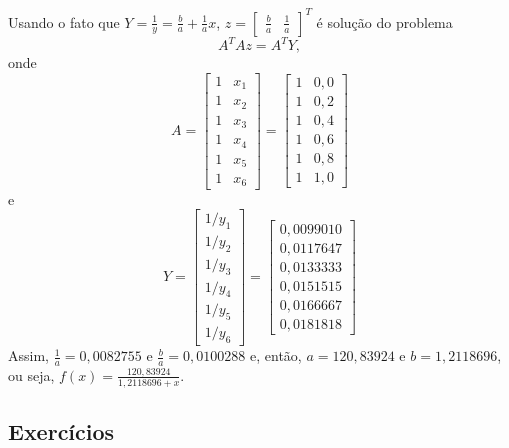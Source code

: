 \begin{resol}
Usando o fato que $Y=\frac{1}{y}=\frac{b}{a}+\frac{1}{a}x$, $z=[\begin{array}{cc}\frac{b}{a} &\frac{1}{a}\end{array}]^T$ é solução do problema
\begin{equation}
A^TAz=A^TY,
\end{equation}
onde
\begin{equation}
A=\left[\begin{array}{cc}1& x_1\\ 1& x_2\\ 1&x_3\\1&x_4 \\ 1&x_5 \\ 1&x_6 \end{array}\right]=\left[\begin{array}{cc}
  1 &  0,0\\
  1 &  0,2\\
  1 &  0,4\\
  1 &  0,6\\
  1 &  0,8\\
  1 &  1,0
\end{array}\right]
\end{equation}
e
\begin{equation}
Y=\left[\begin{array}{c}
  1/y_1\\
    1/y_2\\
    1/y_3\\
    1/y_4\\
    1/y_5\\
    1/y_6
\end{array}\right]=\left[\begin{array}{c}
  0,0099010\\
  0,0117647\\
  0,0133333\\
  0,0151515\\
  0,0166667\\
  0,0181818
\end{array}\right]
\end{equation}
Assim, $\frac{1}{a}=0,0082755$ e $\frac{b}{a}=0,0100288$ e, então, $a=120,83924$ e $b=1,2118696$, ou seja, $f(x)=\frac{120,83924}{1,2118696+x}$.
\end{resol}

\subsection*{Exercícios}

\construirExer
